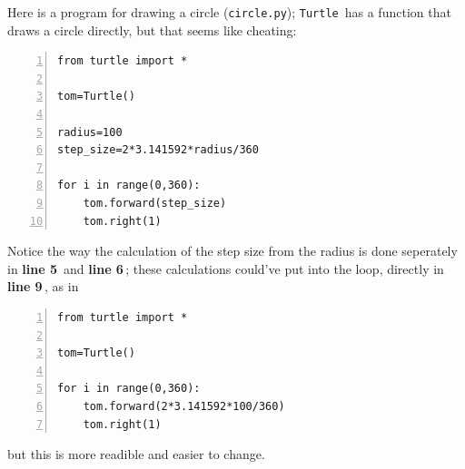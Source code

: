 \documentclass[11pt,a4paper]{scrartcl}
\newcommand{\turtle}{\texttt{Turtle}\,}
\newcommand{\lnn}[1]{\textbf{line #1}\,}
\begin{document}
Here is a program for drawing a circle (\texttt{circle.py}); \turtle
has a function that draws a circle directly, but that seems like
cheating:
\begin{lstlisting}[numbers=left]
from turtle import *

tom=Turtle()

radius=100
step_size=2*3.141592*radius/360

for i in range(0,360):
    tom.forward(step_size)
    tom.right(1)
\end{lstlisting}
Notice the way the calculation of the step size from the radius is
done seperately in \lnn{5} and \lnn{6}; these calculations could've
put into the loop, directly in \lnn{9}, as in 
\begin{lstlisting}[numbers=left]
from turtle import *

tom=Turtle()

for i in range(0,360):
    tom.forward(2*3.141592*100/360)
    tom.right(1)
\end{lstlisting}
but this is more readible and easier to change.
\end{document}
